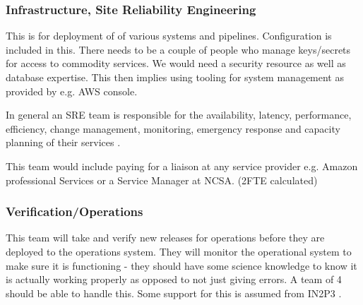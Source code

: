 \subsubsection{Infrastructure, Site Reliability Engineering  } \label{ses:infra}
This is for deployment of of various systems and pipelines. Configuration is included in this. There needs to be a couple of people who manage keys/secrets
for access to commodity services. We would need a security resource as well as database expertise.  This then implies using tooling for system management as
provided by e.g. AWS console.

In general an SRE team is responsible for the availability, latency, performance, efficiency, change management, monitoring, emergency response and capacity planning of their services \cite{Beyer:2016:SRE:3006357}.

This team would include paying for a liaison at any service provider e.g. Amazon professional Services or a Service Manager at NCSA. (2FTE calculated)

\subsubsection{Verification/Operations }
This team will take and verify new releases for operations before they are deployed to the operations system. They will monitor the operational system to make sure it is functioning - they should have some science knowledge to know it is actually working properly as opposed to not just giving errors. A team of 4 should be able to handle this.
Some support for this is assumed from IN2P3 .
